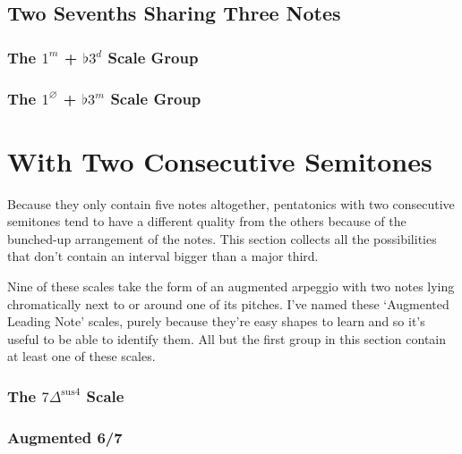 \documentclass[english]{./gbook}
\begin{document}
\begin{large}
\subsection{Two Sevenths Sharing Three Notes}

\subsubsection{The $1^m$ + $\flat 3^d$ Scale Group}

\subsubsection{The $1^\varnothing$ + $\flat 3^m$ Scale Group}

\section{With Two Consecutive Semitones}

Because they only contain five notes altogether, pentatonics with two consecutive semitones tend to have a different quality from the others because of the bunched-up arrangement of the notes. This section collects all the possibilities that don't contain an interval bigger than a major third.

Nine of these scales take the form of an augmented arpeggio with two notes lying chromatically next to or around one of its pitches. I've named these `Augmented Leading Note' scales, purely because they're easy shapes to learn and so it's useful to be able to identify them. All but the first group in this section contain at least one of these scales.

\subsubsection{The $7\Delta^{\text{sus4}}$ Scale}

\subsubsection{Augmented 6/7}


\end{large}
\end{document}

